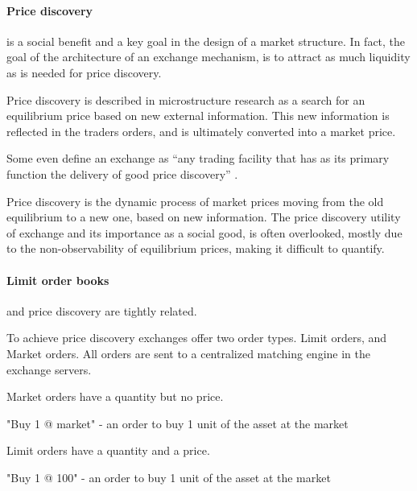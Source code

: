 \documentclass[12pt]{article}
\begin{document}
\paragraph*{Price discovery}is a social benefit and a key goal in the design of a market structure. In fact, the goal of the architecture of an exchange mechanism, is to attract as much liquidity as is needed for price discovery.  \cite{francioni_schwartz_2017}

Price discovery is described in microstructure research as a search for an equilibrium price based on new external information. This new information is reflected in the traders orders, and is ultimately converted into a market price. \citep{RePEc:nbr:nberwo:6257}

Some even define an exchange as ``any trading facility that has as its primary function the delivery of good price discovery'' \cite{francioni_schwartz_2017}. 

Price discovery is the dynamic process of market prices moving from the old equilibrium to a new one, based on new information. The price discovery utility of exchange and its importance as a social good, is often overlooked, mostly due to the non-observability of equilibrium prices, making it difficult to quantify. \cite{francioni_schwartz_2017} \cite{RePEc:udb:wpaper:uwec-2005-01-r} 


\paragraph*{Limit order books} and price discovery are tightly related. \citep{RePEc:nbr:nberwo:6257} \cite{RePEc:eee:jfinec:v:17:y:1986:i:1:p:5-26}

To achieve price discovery exchanges offer two order types. Limit orders, and Market orders. All orders are sent to a centralized matching engine in the exchange servers. 

Market orders have a quantity but no price. 

\begin{enumerate*}
    \item "Buy 1 @ market" - an order to buy 1 unit of the asset at the market  
\end{enumerate*}

Limit orders have a quantity and a price. 

\begin{enumerate*}
    \item "Buy 1 @ 100" - an order to buy 1 unit of the asset at the market  
\end{enumerate*}
\end{document}
